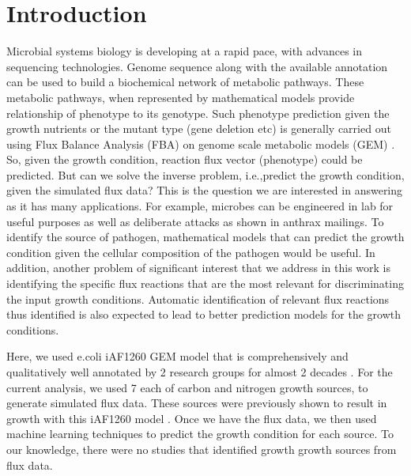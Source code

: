 \documentclass[12pt]{article}
\begin{document}

\section*{Introduction}
Microbial systems biology is developing at a rapid pace, with advances in sequencing technologies. Genome sequence along with the available annotation can be used to build a biochemical network of metabolic pathways. These metabolic pathways, when represented by mathematical models provide relationship of phenotype to its genotype. Such phenotype prediction given the growth nutrients or the mutant type (gene deletion etc) is generally carried out using Flux Balance Analysis (FBA) \cite{Orthetal2010} on genome scale metabolic  models (GEM) \cite{EdwardsPalsson2000, Karpetal1996, OuzounisKarp2000}. So, given the growth condition, reaction flux vector (phenotype) could be predicted. But can we solve the inverse problem, i.e.,predict the growth condition, given the simulated flux data? This is the question we are interested in answering as it has many applications. For example, microbes can be engineered in lab for useful purposes as well as deliberate attacks as shown in anthrax mailings. To identify the source of pathogen, mathematical models that can predict the growth condition given the cellular composition of the pathogen would be useful. In addition, another problem of significant interest that we address in this work is identifying the specific flux reactions that are the most relevant for discriminating the input growth conditions. Automatic identification of relevant flux reactions thus identified is also expected to lead to better prediction models for the growth conditions.

\bigskip
\noindent
Here, we used e.coli iAF1260 GEM model \cite{Feistetal2007} that is comprehensively and qualitatively well annotated by 2 research groups for almost 2 decades \cite{EdwardsPalsson2000,Reedetal2003,Feistetal2007,Orthetal2012}. For the current analysis, we used 7 each of carbon and nitrogen growth sources, to generate simulated flux data. These sources were previously shown to result in growth with this iAF1260 model \cite{Feistetal2007}. Once we have the flux data, we then used machine learning techniques to predict the growth condition for each source. To our knowledge, there were no studies that identified growth growth sources from flux data.
\end{document}
